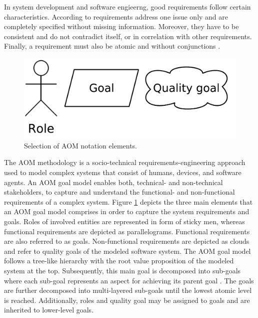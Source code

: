 \documentclass{llncs}
\begin{document}
{			In system development and software engieerng, good requirements follow certain characteristics. According to \cite{davis1993software}\cite{ieee1994ieee} requirements address one issue only and are completely specified without missing information. Moreover, they have to be consistent and do not contradict itself, or in correlation with other requirements. Finally, a requirement must also be atomic and without conjunctions \cite{norta2014reference}.

			\begin{figure}[H]
				\centering
				\includegraphics[scale=0.2]{Figures/20180426_AOM-notation.pdf}
				\caption{Selection of AOM notation elements.}	
				\label{fig:aom-notaion-elements}
			\end{figure}				
			The AOM methodology is a socio-technical requirements-engineering approach used to model complex systems that consist of humans, devices, and software agents. An AOM goal model enables both, technical- and non-technical stakeholders, to capture and understand the functional- and non-functional requirements of a complex system. Figure \ref{fig:aom-notaion-elements} depicts the three main elements that an AOM goal model comprises in order to capture the system requirements and goals. Roles of involved entities are represented in form of sticky men, whereas functional requirements are depicted as parallelograms. Functional requirements are also referred to as goals. Non-functional requirements are depicted as clouds and refer to quality goals of the modeled software system. The AOM goal model follows a tree-like hierarchy with the root value proposition of the modeled system at the top. Subsequently, this main goal is decomposed into sub-goals where each sub-goal represents an aspect for achieving its parent goal \cite{marshall2014agent}. The goals are further decomposed into multi-layered sub-goals until the lowest atomic level is reached. Additionally, roles and quality goal may be assigned to goals and are inherited to lower-level goals.

			
					
}
\end{document}
